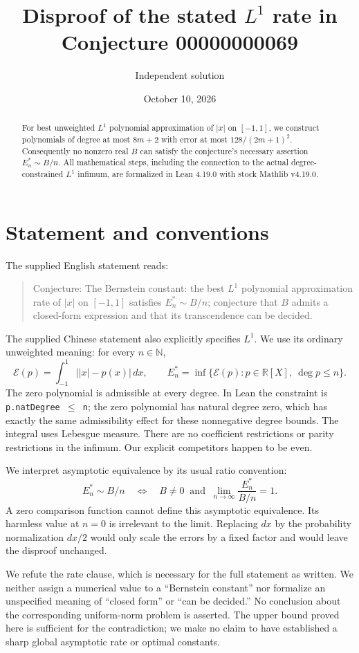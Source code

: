 \documentclass[11pt]{article}
\title{Disproof of the stated $L^1$ rate in Conjecture 00000000069}
\author{Independent solution}
\date{October 10, 2026}
\newcommand{\R}{\mathbb R}
\newcommand{\N}{\mathbb N}
\newcommand{\dd}{\,dx}
\begin{document}
\maketitle
\begin{abstract}
For best unweighted $L^1$ polynomial approximation of $|x|$ on $[-1,1]$, we construct polynomials of degree at most $8m+2$ with error at most $128/(2m+1)^2$. Consequently no nonzero real $B$ can satisfy the conjecture's necessary assertion $E_n^*\sim B/n$. All mathematical steps, including the connection to the actual degree-constrained $L^1$ infimum, are formalized in Lean 4.19.0 with stock Mathlib v4.19.0.
\end{abstract}

\section{Statement and conventions}
The supplied English statement reads:
\begin{quote}
Conjecture: The Bernstein constant: the best $L^1$ polynomial approximation rate of $|x|$ on $[-1,1]$ satisfies $E_n^*\sim B/n$; conjecture that $B$ admits a closed-form expression and that its transcendence can be decided.
\end{quote}
The supplied Chinese statement also explicitly specifies $L^1$. We use its ordinary unweighted meaning: for every $n\in\N$,
\[
 \mathcal E(p)=\int_{-1}^{1}\bigl||x|-p(x)\bigr|\dd,
 \qquad E_n^*=\inf\{\mathcal E(p):p\in\R[X],\ \deg p\le n\}.
\]
The zero polynomial is admissible at every degree. In Lean the constraint is \texttt{p.natDegree $\le$ n}; the zero polynomial has natural degree zero, which has exactly the same admissibility effect for these nonnegative degree bounds. The integral uses Lebesgue measure. There are no coefficient restrictions or parity restrictions in the infimum. Our explicit competitors happen to be even.

We interpret asymptotic equivalence by its usual ratio convention:
\[
 E_n^*\sim B/n\quad\Longleftrightarrow\quad
 B\ne0\ \text{ and }\ \lim_{n\to\infty}\frac{E_n^*}{B/n}=1.
\]
A zero comparison function cannot define this asymptotic equivalence. Its harmless value at $n=0$ is irrelevant to the limit. Replacing $dx$ by the probability normalization $dx/2$ would only scale the errors by a fixed factor and would leave the disproof unchanged.

We refute the rate clause, which is necessary for the full statement as written. We neither assign a numerical value to a ``Bernstein constant'' nor formalize an unspecified meaning of ``closed form'' or ``can be decided.'' No conclusion about the corresponding uniform-norm problem is asserted. The upper bound proved here is sufficient for the contradiction; we make no claim to have established a sharp global asymptotic rate or optimal constants.
\end{document}
